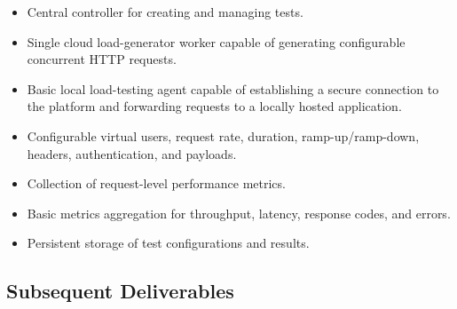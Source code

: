\documentclass[11pt,a4paper]{article}
\begin{document}
\begin{itemize}[leftmargin=0.7cm]

    \item Central controller for creating and managing tests.

    \item Single cloud load-generator worker capable of generating
    configurable concurrent HTTP requests.

    \item Basic local load-testing agent capable of establishing a
    secure connection to the platform and forwarding requests to a
    locally hosted application.

    \item Configurable virtual users, request rate, duration,
    ramp-up/ramp-down, headers, authentication, and payloads.

    \item Collection of request-level performance metrics.

    \item Basic metrics aggregation for throughput, latency,
    response codes, and errors.

    \item Persistent storage of test configurations and results.

\end{itemize}

\subsection{Subsequent Deliverables}
\end{document}
